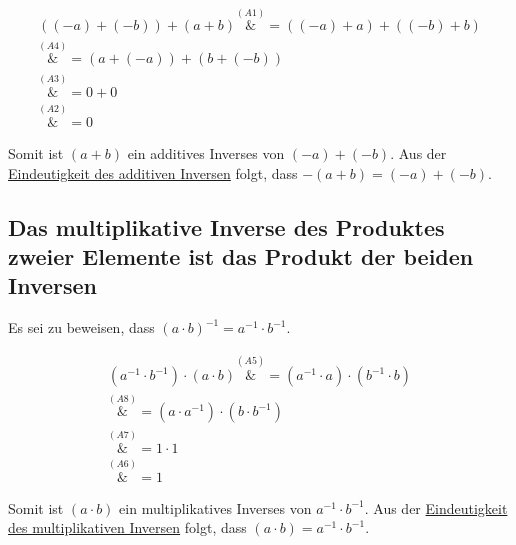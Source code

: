 \documentclass{article}
\begin{document}
\begin{align*}
  ((-a) + (-b)) + (a + b) \overset{\hyperref[a1]{(A1)}}&= ((-a) + a) + ((-b) + b) \\
                          \overset{\hyperref[a4]{(A4)}}&= (a + (-a)) + (b + (-b)) \\
                          \overset{\hyperref[a3]{(A3)}}&= 0 + 0 \\
                          \overset{\hyperref[a2]{(A2)}}&= 0
\end{align*}

Somit ist $(a + b)$ ein additives Inverses von $(-a) + (-b)$. Aus der
\hyperref[eindeutigkeit_add_inv]{Eindeutigkeit des additiven Inversen}
folgt, dass $-(a + b) = (-a) + (-b)$.

\subsection{Das multiplikative Inverse des Produktes zweier Elemente ist das Produkt der beiden Inversen}

Es sei zu beweisen, dass $(a \cdot b)^{-1} = a^{-1} \cdot b^{-1}$.

\begin{align*}
  (a^{-1} \cdot b^{-1}) \cdot (a \cdot b) \overset{\hyperref[a5]{(A5)}}&= (a^{-1} \cdot a) \cdot (b^{-1} \cdot b) \\
                                         \overset{\hyperref[a8]{(A8)}}&= (a \cdot a^{-1}) \cdot (b \cdot b^{-1}) \\
                                         \overset{\hyperref[a7]{(A7)}}&= 1 \cdot 1 \\
                                         \overset{\hyperref[a6]{(A6)}}&= 1
\end{align*}

Somit ist $(a \cdot b)$ ein multiplikatives Inverses von $a^{-1} \cdot b^{-1}$. Aus der
\hyperref[eindeutigkeit_mul_inv]{Eindeutigkeit des multiplikativen Inversen}
folgt, dass $(a \cdot b) = a^{-1} \cdot b^{-1}$.
\end{document}
